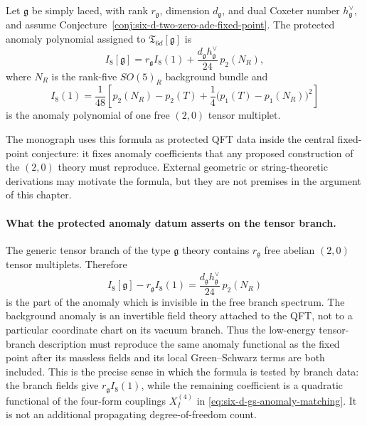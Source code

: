 \begin{conjecture}
\label{conj:six-d-two-zero-anomaly-polynomial}
Let \(\mathfrak g\) be simply laced, with rank \(r_{\mathfrak g}\), dimension
\(d_{\mathfrak g}\), and dual Coxeter number \(h^\vee_{\mathfrak g}\), and
assume
Conjecture~\ref{conj:six-d-two-zero-ade-fixed-point}.  The protected anomaly
polynomial assigned to \(\mathfrak T_{6d}[\mathfrak g]\) is
\begin{equation}
  I_8[\mathfrak g]
  =
  r_{\mathfrak g} I_8(1)
  +
  \frac{d_{\mathfrak g}h^\vee_{\mathfrak g}}{24}\,
  p_2(N_R),
  \label{eq:six-d-two-zero-anomaly}
\end{equation}
where \(N_R\) is the rank-five \(SO(5)_R\) background bundle and
\begin{equation}
  I_8(1)
  =
  \frac1{48}
  \left[
    p_2(N_R)-p_2(T)
    +\frac14\bigl(p_1(T)-p_1(N_R)\bigr)^2
  \right]
  \label{eq:six-d-free-tensor-anomaly}
\end{equation}
is the anomaly polynomial of one free \((2,0)\) tensor multiplet.
\end{conjecture}

The monograph uses this formula as protected QFT data inside the central
fixed-point conjecture: it fixes anomaly coefficients that any proposed
construction of the \((2,0)\) theory must reproduce.
External geometric or string-theoretic derivations may motivate the formula,
but they are not premises in the argument of this chapter.

\paragraph{What the protected anomaly datum asserts on the tensor branch.}
The generic tensor branch of the type \(\mathfrak g\) theory contains
\(r_{\mathfrak g}\) free abelian \((2,0)\) tensor multiplets.  Therefore
\begin{equation}
  I_8[\mathfrak g]-r_{\mathfrak g}I_8(1)
  =
  \frac{d_{\mathfrak g}h^\vee_{\mathfrak g}}{24}\,p_2(N_R)
  \label{eq:six-d-two-zero-interacting-excess}
\end{equation}
is the part of the anomaly which is invisible in the free branch spectrum.
The background anomaly is an invertible field theory attached to the QFT,
not to a particular coordinate chart on its vacuum branch.  Thus the
low-energy tensor-branch description must reproduce the same anomaly
functional as the fixed point after its massless fields and its local
Green--Schwarz terms are both included.  This is the precise sense in which
the formula is tested by branch data: the branch fields give
\(r_{\mathfrak g}I_8(1)\), while the remaining coefficient is a quadratic
functional of the four-form couplings \(X_I^{(4)}\) in
\eqref{eq:six-d-gs-anomaly-matching}.  It is not an additional propagating
degree-of-freedom count.

